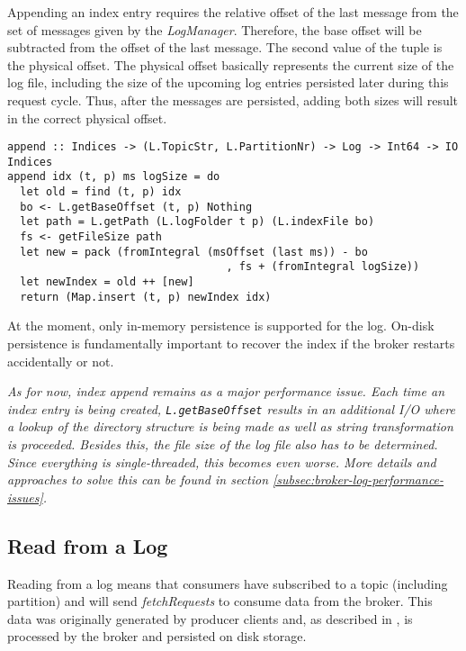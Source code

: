 Appending an index entry requires the relative offset of the last message from
the set of messages given by the \textit{LogManager}. Therefore, the base offset will be
subtracted from the offset of the last message. The second value of the tuple is
the physical offset. The physical offset basically represents the current size
of the log file, including the size of the upcoming log entries persisted later
during this request cycle. Thus, after the messages are persisted, adding both
sizes will result in the correct physical offset.

\begin{lstlisting}[caption={Appending new entry to index}]
append :: Indices -> (L.TopicStr, L.PartitionNr) -> Log -> Int64 -> IO Indices
append idx (t, p) ms logSize = do
  let old = find (t, p) idx
  bo <- L.getBaseOffset (t, p) Nothing 
  let path = L.getPath (L.logFolder t p) (L.indexFile bo)
  fs <- getFileSize path
  let new = pack (fromIntegral (msOffset (last ms)) - bo
                                  , fs + (fromIntegral logSize)) 
  let newIndex = old ++ [new]
  return (Map.insert (t, p) newIndex idx)
\end{lstlisting}

At the moment, only in-memory persistence is supported for the log. On-disk
persistence is fundamentally important to recover the index if the broker
restarts accidentally or not.

\textit{As for now, index append remains as a major performance issue. Each time
  an index entry is being created, \lstinline{L.getBaseOffset} results in an
  additional I/O where a lookup of the directory structure is being made as well
  as string transformation is proceeded. Besides this, the file size of the log
file also has to be determined. Since everything is single-threaded, this
becomes even worse. More details and approaches to solve this can be found in
section \ref{subsec:broker-log-performance-issues}.}

\subsection{Read from a Log}
\label{subsec:broker-log-read}

Reading from a log means that consumers have subscribed to a topic (including
partition) and will send \textit{fetchRequests} to consume data from the broker.
This data was originally generated by producer clients and, as described in
\label{subsec:broker-log-append}, is processed by the broker and persisted on
disk storage.

